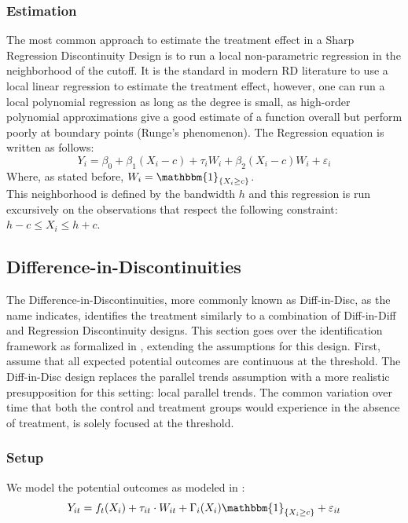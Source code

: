 \documentclass[12pt]{article}
\theoremstyle{plain}
\theoremstyle{remark}
\begin{document}
\subsubsection{Estimation}
The most common approach to estimate the treatment effect in a Sharp Regression Discontinuity Design is to run a local non-parametric regression in the neighborhood of the cutoff. It is the standard in modern RD literature to use a local linear regression to estimate the treatment effect, however, one can run a local polynomial regression as long as the degree is small, as high-order polynomial approximations give a good estimate of a function overall but perform poorly at boundary points (Runge's phenomenon). The Regression equation is written as follows:
\begin{equation}
    Y_i = \beta_0 + \beta_{1}(X_i-c) + \tau_{i}W_i + \beta_{2}(X_{i}-c)W_{i}+\varepsilon_i
\end{equation}
Where, as stated before, $W_{i}=\mathbbm{1}_{\{X_i \geq c\}}$.\\

This neighborhood is defined by the bandwidth $h$ and this regression is run excursively on the observations that respect the following constraint: $h-c\leq X_i\leq h+c$. 


\subsection{Difference-in-Discontinuities}
The Difference-in-Discontinuities, more commonly known as Diff-in-Disc, as the name indicates, identifies the treatment similarly to a combination of Diff-in-Diff and Regression Discontinuity designs. This section goes over the identification framework as formalized in \textcite{grembi2016do}, extending the assumptions for this design. First, assume that all expected potential outcomes are continuous at the threshold. The Diff-in-Disc design replaces the parallel trends assumption with a more realistic presupposition for this setting: local parallel trends. The common variation over time that both the control and treatment groups would experience in the absence of treatment, is solely focused at the threshold.

\subsubsection{Setup}
We model the potential outcomes as modeled in \textcite{Butts_2023}:
    \begin{equation}
        Y_{it}= f_t(X_{i})+ \tau_{it}\cdot W_{it}+ \Gamma_{i}(X_i)\mathbbm{1}_{\{X_i\geq c\}} +\varepsilon_{it}
    \end{equation}
        
\end{document}
